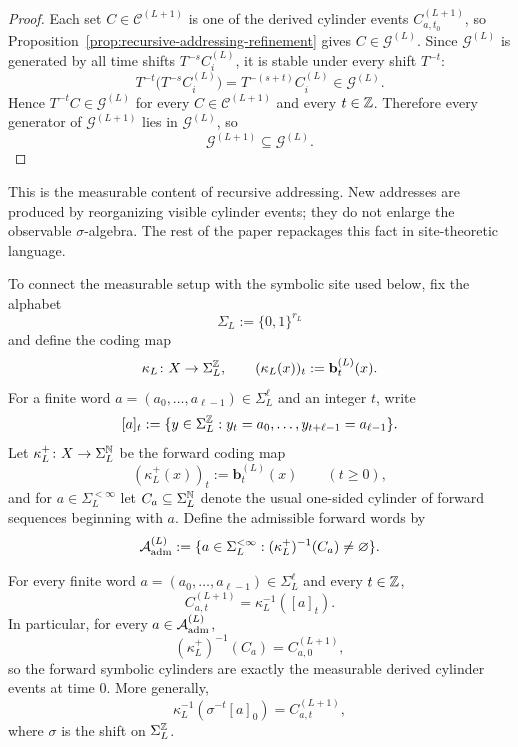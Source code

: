 \begin{proof}
Each set $C\in\mathcal{C}^{(L+1)}$ is one of the derived cylinder events
$C_{a,t_0}^{(L+1)}$, so Proposition~\ref{prop:recursive-addressing-refinement}
gives $C\in\mathcal{G}^{(L)}$.  Since $\mathcal{G}^{(L)}$ is generated by all
time shifts $T^{-s}C_i^{(L)}$, it is stable under every shift $T^{-t}$:
\[
T^{-t}\bigl(T^{-s}C_i^{(L)}\bigr)=T^{-(s+t)}C_i^{(L)}\in \mathcal{G}^{(L)}.
\]
Hence $T^{-t}C\in\mathcal{G}^{(L)}$ for every $C\in\mathcal{C}^{(L+1)}$ and
every $t\in\mathbb{Z}$.  Therefore every generator of $\mathcal{G}^{(L+1)}$ lies in
$\mathcal{G}^{(L)}$, so
\[
\mathcal{G}^{(L+1)}\subseteq \mathcal{G}^{(L)}.
\]
\end{proof}

\begin{remark}
This is the measurable content of recursive addressing.  New addresses are
produced by reorganizing visible cylinder events; they do not enlarge the
observable $\sigma$-algebra.  The rest of the paper repackages this fact in
site-theoretic language.
\end{remark}

To connect the measurable setup with the symbolic site used below, fix the
alphabet
\[
\Sigma_L:=\{0,1\}^{r_L}
\]
and define the coding map
\[
\kappa_L\colon X\to \Sigma_L^{\mathbb{Z}},
\qquad
(\kappa_L(x))_t:=\mathbf{b}^{(L)}_t(x).
\]
For a finite word $a=(a_0,\dots,a_{\ell-1})\in \Sigma_L^\ell$ and an integer
$t$, write
\[
[a]_t
:=
\{y\in \Sigma_L^{\mathbb{Z}}: y_t=a_0,\dots,y_{t+\ell-1}=a_{\ell-1}\}.
\]
Let $\kappa_L^+\colon X\to \Sigma_L^{\mathbb{N}}$ be the forward coding map
\[
(\kappa_L^+(x))_t:=\mathbf{b}^{(L)}_t(x)
\qquad (t\ge 0),
\]
and for $a\in \Sigma_L^{<\infty}$ let $C_a\subseteq \Sigma_L^{\mathbb{N}}$ denote the
usual one-sided cylinder of forward sequences beginning with $a$.  Define the
admissible forward words by
\[
\mathcal{A}_{\mathrm{adm}}^{(L)}
:=
\{a\in \Sigma_L^{<\infty}: (\kappa_L^+)^{-1}(C_a)\neq\varnothing\}.
\]

\begin{proposition}
\label{prop:measurable-coding-prefix-bridge}
For every finite word $a=(a_0,\dots,a_{\ell-1})\in \Sigma_L^\ell$ and every
$t\in\mathbb{Z}$,
\[
C_{a,t}^{(L+1)}=\kappa_L^{-1}([a]_t).
\]
In particular, for every $a\in \mathcal{A}_{\mathrm{adm}}^{(L)}$,
\[
(\kappa_L^+)^{-1}(C_a)=C_{a,0}^{(L+1)},
\]
so the forward symbolic cylinders are exactly the measurable derived cylinder
events at time $0$.  More generally,
\[
\kappa_L^{-1}(\sigma^{-t}[a]_0)=C_{a,t}^{(L+1)},
\]
where $\sigma$ is the shift on $\Sigma_L^{\mathbb{Z}}$.
\end{proposition}

